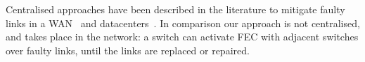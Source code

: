 Centralised approaches have been described in the literature to mitigate
faulty links in a WAN~\cite{traffic-engineering-with-forward-fault-correction}
and datacenters~\cite{Zhuo:2017:UMP:3098822.3098849}. In comparison our approach
is not centralised, and takes place in the network: a switch can activate
FEC with adjacent switches over faulty links, until the links are replaced or
repaired.
